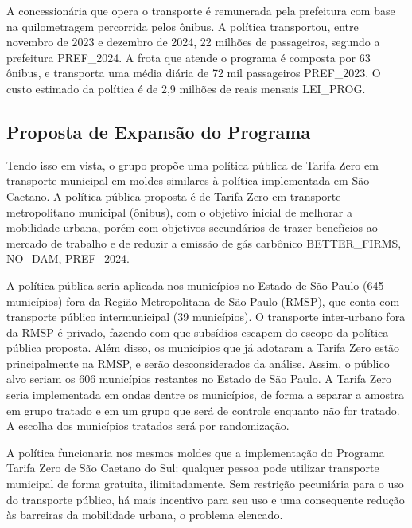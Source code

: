 A concessionária que opera o transporte é remunerada pela prefeitura com base na quilometragem percorrida pelos ônibus. A política transportou, entre novembro de 2023 e dezembro de 2024, 22 milhões de passageiros, segundo a prefeitura PREF_2024. A frota que atende o programa é composta por 63 ônibus, e transporta uma média diária de 72 mil passageiros PREF_2023. O custo estimado da política é de 2,9 milhões de reais mensais LEI_PROG.

\subsection{Proposta de Expansão do Programa}

Tendo isso em vista, o grupo propõe uma política pública de Tarifa Zero em transporte municipal em moldes similares à política implementada em São Caetano. A política pública proposta é de Tarifa Zero em transporte metropolitano municipal (ônibus), com o objetivo inicial de melhorar a mobilidade urbana, porém com objetivos secundários de trazer benefícios ao mercado de trabalho e de reduzir a emissão de gás carbônico BETTER_FIRMS, NO_DAM, PREF_2024.

A política pública seria aplicada nos municípios no Estado de São Paulo (645 municípios) fora da Região Metropolitana de São Paulo (RMSP), que conta com transporte público intermunicipal (39 municípios). O transporte inter-urbano fora da RMSP é privado, fazendo com que subsídios escapem do escopo da política pública proposta. Além disso, os municípios que já adotaram a Tarifa Zero estão principalmente na RMSP, e serão desconsiderados da análise. Assim, o público alvo seriam os 606 municípios restantes no Estado de São Paulo. A  Tarifa Zero seria implementada em ondas dentre os municípios, de forma a separar a amostra em grupo tratado e em um grupo que será de controle enquanto não for tratado. A escolha dos municípios tratados será por randomização.

A política funcionaria nos mesmos moldes que a implementação do Programa Tarifa Zero de São Caetano do Sul: qualquer pessoa pode utilizar transporte municipal de forma gratuita, ilimitadamente. Sem restrição pecuniária para o uso do transporte público, há mais incentivo para seu uso e uma consequente redução às barreiras da mobilidade urbana, o problema elencado.
